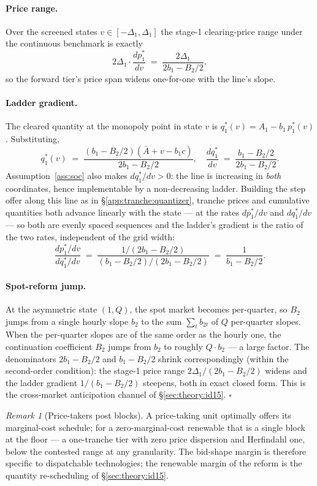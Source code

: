 \documentclass[11pt,a4paper]{article}
\theoremstyle{definition}
\theoremstyle{remark}
\newtheorem{remark}{Remark}
\theoremstyle{plain}
\begin{document}
\paragraph{Price range.} Over the screened states $v \in [-\Delta_1, \Delta_1]$ the stage-1 clearing-price range under the continuous benchmark is exactly
\[
2\Delta_1 \cdot \frac{dp_1^*}{dv} \;=\; \frac{2\Delta_1}{2 b_1 - B_2/2},
\]
so the forward tier's price span widens one-for-one with the line's slope.

\paragraph{Ladder gradient.} The cleared quantity at the monopoly point in state $v$ is $q_1^*(v) = A_1 - b_1\,p_1^*(v)$. Substituting,
\[
q_1^*(v) \;=\; \frac{(b_1 - B_2/2)(\bar A + v - b_1 c)}{2 b_1 - B_2/2},
\quad
\frac{dq_1^*}{dv} \;=\; \frac{b_1 - B_2/2}{2 b_1 - B_2/2}.
\]
Assumption~\ref{ass:soc} also makes $dq_1^*/dv > 0$: the line is increasing in \emph{both} coordinates, hence implementable by a non-decreasing ladder. Building the step offer along this line as in \S\ref{app:tranche:quantizer}, tranche prices and cumulative quantities both advance linearly with the state --- at the rates $dp_1^*/dv$ and $dq_1^*/dv$ --- so both are evenly spaced sequences and the ladder's gradient is the ratio of the two rates, independent of the grid width:
\[
\frac{dp_1^*/dv}{dq_1^*/dv} \;=\; \frac{1/(2 b_1 - B_2/2)}{(b_1 - B_2/2)/(2 b_1 - B_2/2)} \;=\; \frac{1}{b_1 - B_2/2}.
\]

\paragraph{Spot-reform jump.} At the asymmetric state $(1, Q)$, the spot market becomes per-quarter, so $B_2$ jumps from a single hourly slope $b_2$ to the sum $\sum_t b_{2t}$ of $Q$ per-quarter slopes. When the per-quarter slopes are of the same order as the hourly one, the continuation coefficient $B_2$ jumps from $b_2$ to roughly $Q \cdot b_2$ --- a large factor. The denominators $2 b_1 - B_2/2$ and $b_1 - B_2/2$ shrink correspondingly (within the second-order condition): the stage-1 price range $2\Delta_1/(2 b_1 - B_2/2)$ widens and the ladder gradient $1/(b_1 - B_2/2)$ steepens, both in exact closed form. This is the cross-market anticipation channel of \S\ref{sec:theory:id15}. $\square$

\begin{remark}[Price-takers post blocks]\label{rem:pricetaker}
A price-taking unit optimally offers its marginal-cost schedule; for a zero-marginal-cost renewable that is a single block at the floor --- a one-tranche tier with zero price dispersion and Herfindahl one, below the contested range at any granularity. The bid-shape margin is therefore specific to dispatchable technologies; the renewable margin of the reform is the quantity re-scheduling of \S\ref{sec:theory:id15}.
\end{remark}
\end{document}
